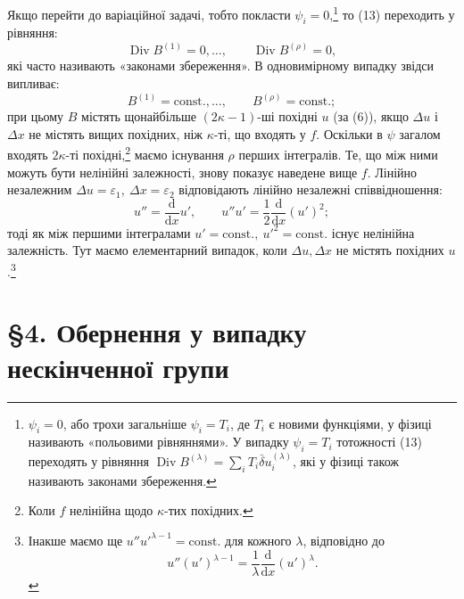 \documentclass[11pt]{article}
\providecommand{\eps}{\varepsilon}
\providecommand{\D}{\Delta}
\providecommand{\dd}{\mathrm d}
\DeclareMathOperator{\Div}{Div}
\providecommand{\bd}{\bar{\delta}}
\begin{document}
Якщо перейти до варіаційної задачі, тобто покласти \(\psi_i=0\),\footnote{\(\psi_i=0\), або трохи загальніше \(\psi_i=T_i\), де \(T_i\) є новими функціями, у фізиці називають «польовими рівняннями». У випадку \(\psi_i=T_i\) тотожності (13) переходять у рівняння \(\Div B^{(\lambda)}=\sum_i T_i\bd u_i^{(\lambda)}\), які у фізиці також називають законами збереження.} то (13) переходить у рівняння:
\[
\Div B^{(1)}=0,\ldots,\qquad \Div B^{(\rho)}=0,
\]
які часто називають «законами збереження». В одновимірному випадку звідси випливає:
\[
B^{(1)}=\mathrm{const.},\ldots,\qquad B^{(\rho)}=\mathrm{const.};
\]
при цьому \(B\) містять щонайбільше \((2\kappa-1)\)-ші похідні \(u\) (за (6)), якщо \(\D u\) і \(\D x\) не містять вищих похідних, ніж \(\kappa\)-ті, що входять у \(f\). Оскільки в \(\psi\) загалом входять \(2\kappa\)-ті похідні,\footnote{Коли \(f\) нелінійна щодо \(\kappa\)-тих похідних.} маємо існування \(\rho\) перших інтегралів. Те, що між ними можуть бути нелінійні залежності, знову показує наведене вище \(f\). Лінійно незалежним \(\D u=\eps_1,\ \D x=\eps_2\) відповідають лінійно незалежні співвідношення:
\[
u''=\frac{\dd}{\dd x}u',\qquad
u''u'=\frac12\frac{\dd}{\dd x}(u')^2;
\]
тоді як між першими інтегралами \(u'=\mathrm{const.},\ u'^2=\mathrm{const.}\) існує нелінійна залежність. Тут маємо елементарний випадок, коли \(\D u,\D x\) не містять похідних \(u\).\footnote{Інакше маємо ще \(u''u'^{\lambda-1}=\mathrm{const.}\) для кожного \(\lambda\), відповідно до
\[
u''(u')^{\lambda-1}=\frac1\lambda\frac{\dd}{\dd x}(u')^\lambda.
\]}

\section*{\S{}4. Обернення у випадку нескінченної групи}
\end{document}
